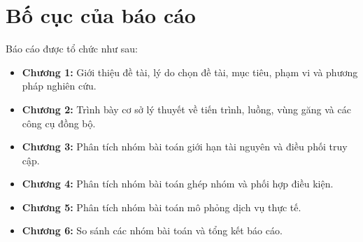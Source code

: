 \section{Bố cục của báo cáo}

Báo cáo được tổ chức như sau:

\begin{itemize}
    \item \textbf{Chương 1:} Giới thiệu đề tài, lý do chọn đề tài, mục tiêu, phạm vi và phương pháp nghiên cứu.
    \item \textbf{Chương 2:} Trình bày cơ sở lý thuyết về tiến trình, luồng, vùng găng và các công cụ đồng bộ.
    \item \textbf{Chương 3:} Phân tích nhóm bài toán giới hạn tài nguyên và điều phối truy cập.
    \item \textbf{Chương 4:} Phân tích nhóm bài toán ghép nhóm và phối hợp điều kiện.
    \item \textbf{Chương 5:} Phân tích nhóm bài toán mô phỏng dịch vụ thực tế.
    \item \textbf{Chương 6:} So sánh các nhóm bài toán và tổng kết báo cáo.
\end{itemize}
